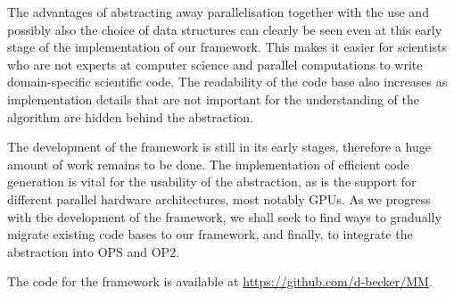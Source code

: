 \documentclass[fontsize=11pt, appendixprefix=true]{scrreprt}
\begin{document}
The advantages of abstracting away parallelisation together with the use and
possibly also the choice of data structures can clearly be seen even at this
early stage of the implementation of our framework. This makes it easier for
scientists who are not experts at computer science and parallel computations to
write domain-specific scientific code. The readability of the code base also
increases as implementation details that are not important for the understanding
of the algorithm are hidden behind the abstraction.

The development of the framework is still in its early stages, therefore a huge
amount of work remains to be done. The implementation of efficient code
generation is vital for the usability of the abstraction, as is the support for
different parallel hardware architectures, most notably GPUs. As we progress
with the development of the framework, we shall seek to find ways to gradually
migrate existing code bases to our framework, and finally, to integrate the
abstraction into OPS and OP2.

The code for the framework is available at \url{https://github.com/d-becker/MM}.

\printbibliography

\end{document}
